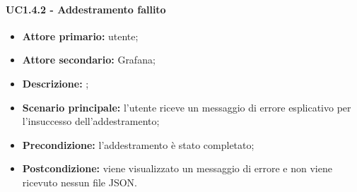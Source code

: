 \documentclass{article}
\begin{document}
	\paragraph{UC1.4.2 - Addestramento fallito}
	\begin{itemize}
		\item \textbf{Attore primario:} utente;
		\item \textbf{Attore secondario:} Grafana;
		\item \textbf{Descrizione: } ;
		\item \textbf{Scenario principale:} l'utente riceve un messaggio di errore esplicativo per l'insuccesso dell'addestramento;
		
		\item \textbf{Precondizione:} l'addestramento è stato completato;
		\item \textbf{Postcondizione:} viene visualizzato un messaggio di errore e non viene ricevuto nessun file JSON.
	\end{itemize}
\end{document}
